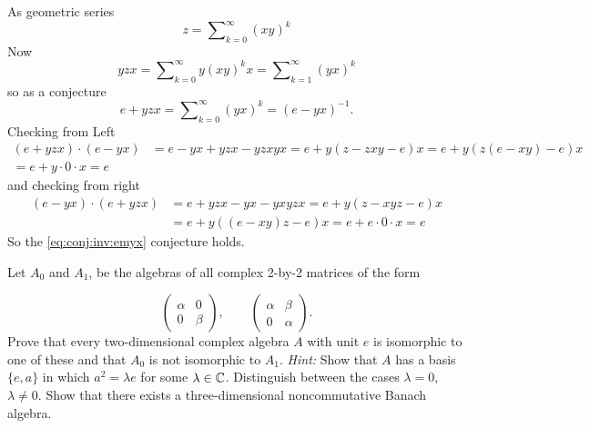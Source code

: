 \begin{enumerate}
\begin{itemize}
As geometric series
\begin{equation*}
z = \sum\nolimits_{k=0}^\infty (xy)^k
\end{equation*}
Now
\begin{equation*}
yzx
= \sum\nolimits_{k=0}^\infty y(xy)^kx
= \sum\nolimits_{k=1}^\infty (yx)^k
\end{equation*}
so as a conjecture
\begin{equation} \label{eq:conj:inv:emyx}
e + yzx = \sum\nolimits_{k=0}^\infty (yx)^k = (e - yx)^{-1}.
\end{equation}
Checking from Left
\begin{align*}
(e + yzx)\cdot(e - yx)
 &= e - yx + yzx - yzxyx
  = e + y(z - zxy - e)x = e + y(z(e - xy) - e)x \\
  = e + y\cdot 0\cdot x = e
\end{align*}
and checking from right
\begin{align*}
(e - yx)\cdot(e + yzx)
 &= e + yzx - yx - yxyzx = e + y(z - xyz - e)x \\
 &= e + y((e - xy)z - e)x
    = e + e\cdot 0\cdot x = e
\end{align*}
So the \eqref{eq:conj:inv:emyx} conjecture holds.
\end{itemize}

\unfinished

\begin{excopy}
Let \(A_0\) and \(A_1\),
be the algebras of all complex 2-by-2 matrices of the form

\begin{equation*}
\left(
  \begin{array}{ll}
   \alpha & 0 \\
   0 & \beta
  \end{array}
\right),
\qquad
\left(
  \begin{array}{ll}
   \alpha & \beta \\
   0 & \alpha
  \end{array}
\right).
\end{equation*}
Prove that every two-dimensional complex algebra $A$ with unit $e$ is isomorphic
to one of these
  and that \(A_0\) is not isomorphic to \(A_1\).
    \emph{Hint:} Show that $A$ has a
basis \(\{e, a\}\) in which \(a^2 = \lambda e\) for some \(\lambda \in \mathbb{C}\).
  Distinguish between the cases
  \(\lambda=0\), \(\lambda \neq 0\).
  Show that there exists a three-dimensional noncommutative
Banach algebra.
\end{excopy}

\unfinished

\begin{excopy}
\end{excopy}

\unfinished

\end{enumerate}
